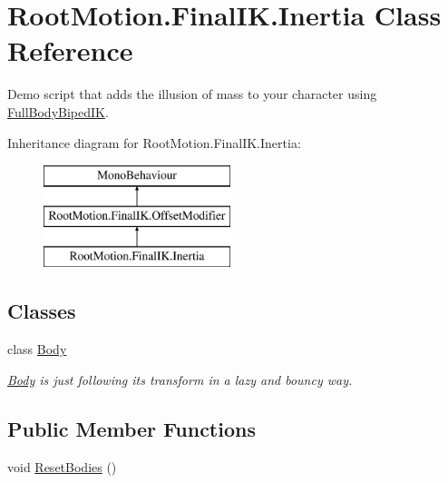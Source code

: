 \hypertarget{class_root_motion_1_1_final_i_k_1_1_inertia}{}\section{Root\+Motion.\+Final\+I\+K.\+Inertia Class Reference}
\label{class_root_motion_1_1_final_i_k_1_1_inertia}


Demo script that adds the illusion of mass to your character using \mbox{\hyperlink{class_root_motion_1_1_final_i_k_1_1_full_body_biped_i_k}{Full\+Body\+Biped\+IK}}.  


Inheritance diagram for Root\+Motion.\+Final\+I\+K.\+Inertia\+:\begin{figure}[H]
\begin{center}
\leavevmode
\includegraphics[height=3.000000cm]{class_root_motion_1_1_final_i_k_1_1_inertia}
\end{center}
\end{figure}
\subsection*{Classes}
\begin{DoxyCompactItemize}
\item 
class \mbox{\hyperlink{class_root_motion_1_1_final_i_k_1_1_inertia_1_1_body}{Body}}
\begin{DoxyCompactList}\small\item\em \mbox{\hyperlink{class_root_motion_1_1_final_i_k_1_1_inertia_1_1_body}{Body}} is just following it\textquotesingle{}s transform in a lazy and bouncy way. \end{DoxyCompactList}\end{DoxyCompactItemize}
\subsection*{Public Member Functions}
\begin{DoxyCompactItemize}
\item 
void \mbox{\hyperlink{class_root_motion_1_1_final_i_k_1_1_inertia_ac619d5414996c0cf828620d41415cc93}{Reset\+Bodies}} ()
\end{DoxyCompactItemize}
